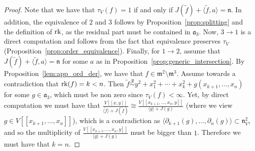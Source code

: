 \documentclass{article}
\newcommand{\equivr}{\overset{\mathcal{R}}{\sim}}
\newcommand{\naxV}{\mathfrak{n}_V}
\numberwithin{theorem}{section}
\begin{document}
\begin{proof}
Note that  we have that $\tau_V\left(f\right)=1$ if and only if $J(\tilde{f})+\langle \tilde{f},  a \rangle = \mathfrak{n}$. In addition, the equivalence of $2$ and $3$ follows by Proposition~\ref{prop:splitting} and the definition of $\textup{rk}$, as the residual part must be contained in $\mathfrak{a}_3$. Now, $3 \to 1$ is a direct computation and follows from the fact that equivalence preserves $\tau_V$ (Proposition~\ref{prop:order_equivalence}). Finally, for $1 \to 2$,  assume that $J(\tilde{f})+\langle \tilde{f}, a \rangle = \mathfrak{n}$ for some $a$ as in Proposition~\ref{prop:generic_intersection}. By Proposition~\ref{lem:app_ord_der}, we have that $f \in \mathfrak{m}^2 \setminus \mathfrak{m}^3$. Assume towards a contradiction that $\textup{rk}(f)=k < n$. Then $\tilde{f} \equivr y^2+  x_1^2 +\cdots +x_k^2 +g\left(x_{k+1}, \dots, x_n\right)$ for some $g \in \mathfrak{a}_3$, which must be non zero since $\tau_V\left(f\right) < \infty$. Yet, by direct computation we must have that $\frac{V[[\underline{x},y]]}{\langle \tilde{f} \rangle + J(\tilde{f})} \cong \frac{V[[x_{k+1}, \dots, x_n, y]]}{\langle g \rangle + J(g)}$ (where we view $g \in V[[x_{k+1}, \dots, x_n]]$), which is a contradiction as $\langle \partial_{k+1} (g) , \dots, \partial_{n} (g)\rangle \subset \naxV^2$, and so the multiplicity of $\frac{V[[x_{k+1}, \dots, x_n, y]]}{\langle g \rangle + J(g)}$ must be bigger than $1$. Therefore we must have that $k=n$. 
\end{proof}
\end{document}
